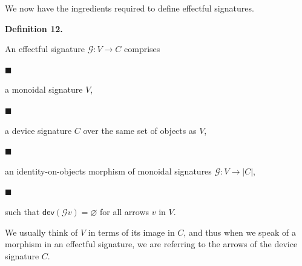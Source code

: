 \documentclass[10pt,a4paper]{article}
\begin{document}
 
 
We now have the ingredients required to define effectful signatures.\par
 
 
 
\par\medskip\noindent\textbf{Definition 12.}\par
 
 
An effectful signature $\mathcal{G}:V\to C$ comprises\par
  
\par\noindent  $\blacksquare$ 
 
a monoidal signature $V$,\par
 
 
 
\par\noindent  $\blacksquare$ 
 
a device signature $C$ over the same set of objects as $V$,\par
 
 
 
\par\noindent  $\blacksquare$ 
 
an identity-on-objects morphism of monoidal signatures $\mathcal{G}:V\to|C|$,\par
 
 
 
\par\noindent  $\blacksquare$ 
 
such that $\mathsf{dev}(\mathcal{G}v)=\varnothing$ for all arrows $v$ in $V$.\par
 
 
  
 
 
 
We usually think of $V$ in terms of its image in $C$, and thus when we speak of a morphism in an effectful signature, we are referring to the arrows of the device signature $C$.\par
 
 
\end{document}
